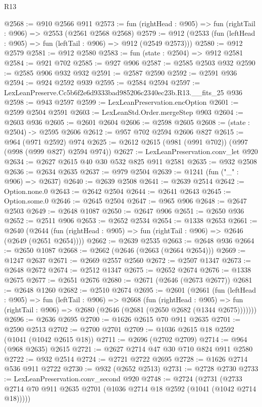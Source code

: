 \begin{lexlean}{R13}
\begin{coremodule}
@2568 := @910 @2566 @911
@2573 := fun (rightHead : @905) => fun (rightTail : @906) => @2553 (@2561 @2568 @2568)
@2579 := @912 (@2533 (fun (leftHead : @905) => fun (leftTail : @906) => @912 (@2549 @2573)))
@2580 := @912 @2579
@2581 := @912 @2580
@2583 := fun (state : @2504) => @912 @2581
@2584 := @921 @702
@2585 := @927 @906
@2587 := @2585 @2503 @932
@2590 := @2585 @906 @932 @932
@2591 := @2587 @2590
@2592 := @2591 @936
@2594 := @924 @2592 @939
@2595 := @2584 @2594
@2597 := LexLeanPreserve.Cc5b6f2e6d9333bad985206c2340ec23b.R13.__fits_25 @936
@2598 := @943 @2597
@2599 := LexLeanPreservation.encOption
@2601 := @2599 @2504 @2591
@2603 := LexLeanStd.Order.mergeStep @903
@2604 := @2603 @936
@2605 := @2601 @2604
@2606 := @2598 @2605
@2608 := (state : @2504) -> @2595 @2606
@2612 := @957 @702 @2594 @2606 @827
@2615 := @964 (@971 @2592) @974
@2625 := @2612 @2615 (@981 (@991 @702)) (@997 (@998 (@999 @827) @2594 @974))
@2627 := LexLeanPreservation.conv_let @920
@2634 := @2627 @2615 @40 @30 @532 @825 @911 @2581
@2635 := @932 @2508
@2636 := @2634 @2635
@2637 := @979 @2504
@2639 := @1241 (fun ("_" : @906) => @2637)
@2640 := @2639 @2508
@2641 := @2639 @2514
@2642 := Option.none.{0}
@2643 := @2642 @2504
@2644 := @2641 @2643
@2645 := Option.some.{0}
@2646 := @2645 @2504
@2647 := @965 @906
@2648 := @2647 @2503
@2649 := @2648 @1087
@2650 := @2647 @906
@2651 := @2650 @936
@2652 := @2511 @906
@2653 := @2652 @2534
@2654 := @1338 @2653
@2661 := @2640
    (@2644 (fun (rightHead : @905) => fun (rightTail : @906) => @2646 (@2649 (@2651 @2654))))
@2662 := @2639 @2535
@2663 := @2648 @936
@2664 := @2650 @1087
@2668 := @2662 (@2646 (@2663 (@2664 @2654)))
@2669 := @1247 @2637
@2671 := @2669 @2557 @2560
@2672 := @2507 @1347
@2673 := @2648 @2672
@2674 := @2512 @1347
@2675 := @2652 @2674
@2676 := @1338 @2675
@2677 := @2651 @2676
@2680 := @2671 (@2646 (@2673 @2677))
@2681 := @2648 @1260
@2682 := @2510 @2674
@2695 := @2601
    (@2661
      (fun (leftHead : @905) =>
      fun (leftTail : @906) =>
      @2668
        (fun (rightHead : @905) =>
        fun (rightTail : @906) => @2680 (@2646 (@2681 (@2650 @2682 (@1344 @2675)))))))
@2696 := @2636 @2695
@2700 := @1626 @2615 @70 @911 @2635
@2701 := @2590 @2513
@2702 := @2700 @2701
@2709 := @1036 @2615 @18 @2592 (@1041 (@1042 @2615 @18))
@2711 := @2696 (@2702 @2709)
@2714 := @964 (@968 @2635) @2615
@2721 := @2627 @2714 @47 @30 @710 @824 @911 @2580
@2722 := @932 @2514
@2724 := @2721 @2722 @2695
@2728 := @1626 @2714 @536 @911 @2722
@2730 := @932 (@2652 @2513)
@2731 := @2728 @2730
@2733 := LexLeanPreservation.conv_second @920
@2748 := @2724
    (@2731 (@2733 @2714 @70 @911 @2635 @2701 (@1036 @2714 @18 @2592 (@1041 (@1042 @2714 @18)))))

\end{coremodule}
\end{lexlean}
